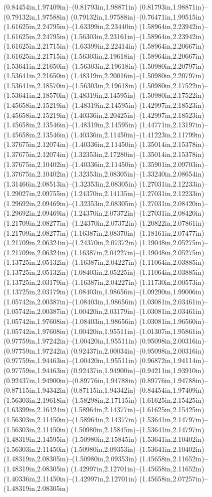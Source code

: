 (0.84454in,1.97409in)--(0.81793in,1.98871in) (0.81793in,1.98871in)--(0.79132in,1.97588in) (0.79132in,1.97588in)--(0.76471in,1.99515in) (1.61625in,2.24795in)--(1.63399in,2.23440in) (1.58964in,2.23942in)--(1.61625in,2.24795in) (1.56303in,2.23161in)--(1.58964in,2.23942in) (1.61625in,2.21715in)--(1.63399in,2.22414in) (1.58964in,2.20667in)--(1.61625in,2.21715in) (1.56303in,2.19618in)--(1.58964in,2.20667in) (1.53641in,2.21650in)--(1.56303in,2.19618in) (1.50980in,2.20797in)--(1.53641in,2.21650in) (1.48319in,2.20016in)--(1.50980in,2.20797in) (1.53641in,2.18570in)--(1.56303in,2.19618in) (1.50980in,2.17522in)--(1.53641in,2.18570in) (1.48319in,2.14595in)--(1.50980in,2.17522in) (1.45658in,2.15219in)--(1.48319in,2.14595in) (1.42997in,2.18523in)--(1.45658in,2.15219in) (1.40336in,2.20425in)--(1.42997in,2.18523in) (1.45658in,2.13546in)--(1.48319in,2.14595in) (1.44771in,2.13197in)--(1.45658in,2.13546in) (1.40336in,2.11450in)--(1.41223in,2.11799in) (1.37675in,2.12074in)--(1.40336in,2.11450in) (1.35014in,2.15378in)--(1.37675in,2.12074in) (1.32353in,2.17280in)--(1.35014in,2.15378in) (1.37675in,2.10402in)--(1.40336in,2.11450in) (1.35901in,2.09703in)--(1.37675in,2.10402in) (1.32353in,2.08305in)--(1.33240in,2.08654in) (1.31466in,2.08513in)--(1.32353in,2.08305in) (1.27031in,2.12233in)--(1.29027in,2.09755in) (1.24370in,2.14135in)--(1.27031in,2.12233in) (1.29692in,2.09469in)--(1.32353in,2.08305in) (1.27031in,2.08420in)--(1.29692in,2.09469in) (1.24370in,2.07372in)--(1.27031in,2.08420in) (1.21709in,2.08277in)--(1.24370in,2.07372in) (1.20822in,2.07861in)--(1.21709in,2.08277in) (1.16387in,2.08370in)--(1.18161in,2.07477in) (1.21709in,2.06324in)--(1.24370in,2.07372in) (1.19048in,2.05275in)--(1.21709in,2.06324in) (1.16387in,2.04227in)--(1.19048in,2.05275in) (1.13725in,2.05132in)--(1.16387in,2.04227in) (1.11064in,2.03885in)--(1.13725in,2.05132in) (1.08403in,2.05225in)--(1.11064in,2.03885in) (1.13725in,2.03179in)--(1.16387in,2.04227in) (1.11730in,2.00573in)--(1.13725in,2.03179in) (1.08403in,1.98656in)--(1.09290in,1.99006in) (1.05742in,2.00387in)--(1.08403in,1.98656in) (1.03081in,2.03461in)--(1.05742in,2.00387in) (1.00420in,2.03179in)--(1.03081in,2.03461in) (1.05742in,1.97608in)--(1.08403in,1.98656in) (1.03081in,1.96560in)--(1.05742in,1.97608in) (1.00420in,1.95511in)--(1.01307in,1.95861in) (0.97759in,1.97242in)--(1.00420in,1.95511in) (0.95098in,2.00316in)--(0.97759in,1.97242in) (0.92437in,2.00034in)--(0.95098in,2.00316in) (0.97759in,1.94463in)--(1.00420in,1.95511in) (0.96872in,1.94114in)--(0.97759in,1.94463in) (0.92437in,1.94900in)--(0.94211in,1.93910in) (0.92437in,1.94900in)--(0.89776in,1.94788in) (0.89776in,1.94788in)--(0.87115in,1.94342in) (0.87115in,1.94342in)--(0.84454in,1.97409in) (1.56303in,2.19618in)--(1.58298in,2.17115in) (1.61625in,2.15425in)--(1.63399in,2.16124in) (1.58964in,2.14377in)--(1.61625in,2.15425in) (1.56303in,2.11450in)--(1.58964in,2.14377in) (1.53641in,2.14797in)--(1.56303in,2.11450in) (1.50980in,2.15845in)--(1.53641in,2.14797in) (1.48319in,2.14595in)--(1.50980in,2.15845in) (1.53641in,2.10402in)--(1.56303in,2.11450in) (1.50980in,2.09353in)--(1.53641in,2.10402in) (1.48319in,2.08305in)--(1.50980in,2.09353in) (1.45658in,2.11652in)--(1.48319in,2.08305in) (1.42997in,2.12701in)--(1.45658in,2.11652in) (1.40336in,2.11450in)--(1.42997in,2.12701in) (1.45658in,2.07257in)--(1.48319in,2.08305in) 